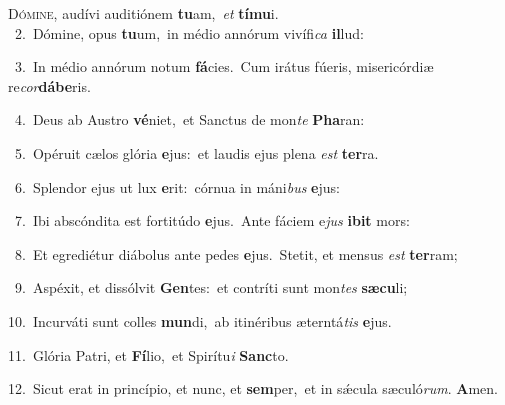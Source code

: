 \lettrine{\initial\textcolor{\initialcolor}{D}}{ómine,} audívi auditiónem \textbf{tu}\-am,~\star \textit{et} \textbf{tí}\-\textbf{mu}i.\\
{\numbfont\textcolor{\numbcolor}{~2.}}~Dómine, opus \textbf{tu}\-um,~\star in médio annórum vivífi\textit{ca} \textbf{il}\-lud:\par
{\numbfont\textcolor{\numbcolor}{~3.}}~In médio annórum notum \textbf{fá}\-cies.~\star Cum irátus fúeris, misericórdiæ re\-\textit{cor}\-\textbf{dá}\textbf{be}ris.\par
{\numbfont\textcolor{\numbcolor}{~4.}}~Deus ab Austro \textbf{vé}\-niet,~\star et Sanctus de mon\textit{te} \textbf{Pha}\-ran:\par
{\numbfont\textcolor{\numbcolor}{~5.}}~Opéruit cælos glória \textbf{e}\-jus:~\star et laudis ejus plena \textit{est} \textbf{ter}\-ra.\par
{\numbfont\textcolor{\numbcolor}{~6.}}~Splendor ejus ut lux \textbf{e}\-rit:~\star córnua in máni\textit{bus} \textbf{e}\-jus:\par
{\numbfont\textcolor{\numbcolor}{~7.}}~Ibi abscóndita est fortitúdo \textbf{e}\-jus.~\star Ante fáciem e\textit{jus} \textbf{i}\-\textbf{bit} mors:\par
{\numbfont\textcolor{\numbcolor}{~8.}}~Et egrediétur diábolus ante pedes \textbf{e}\-jus.~\star Stetit, et mensus \textit{est} \textbf{ter}\-ram;\par
{\numbfont\textcolor{\numbcolor}{~9.}}~Aspéxit, et dissólvit \textbf{Gen}\-tes:~\star et contríti sunt mon\textit{tes} \textbf{sæ}\-\textbf{cu}li;\par
{\numbfont\textcolor{\numbcolor}{10.}}~Incurváti sunt colles \textbf{mun}\-di,~\star ab itinéribus æterntá\textit{tis} \textbf{e}\-jus.\par
{\numbfont\textcolor{\numbcolor}{11.}}~Glória Patri, et \textbf{Fí}\-lio,~\star et Spirítu\textit{i} \textbf{Sanc}\-to.\par
{\numbfont\textcolor{\numbcolor}{12.}}~Sicut erat in princípio, et nunc, et \textbf{sem}\-per,~\star et in sǽcula sæculó\-\textit{rum}\-. \textbf{A}\-men.\par
